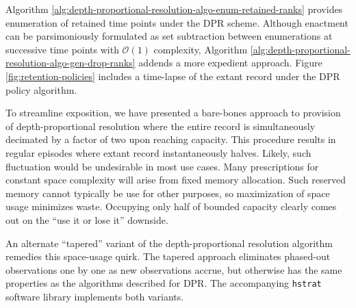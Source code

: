 Algorithm \ref{alg:depth-proportional-resolution-algo-enum-retained-ranks} provides enumeration of retained time points under the DPR scheme.
Although enactment can be parsimoniously formulated as set subtraction between enumerations at successive time points with $\mathcal{O}(1)$ complexity, Algorithm \ref{alg:depth-proportional-resolution-algo-gen-drop-ranks} addends a more expedient approach.
Figure \ref{fig:retention-policies} includes a time-lapse of the extant record under the DPR policy algorithm.

To streamline exposition, we have presented a bare-bones approach to provision of depth-proportional resolution where the entire record is simultaneously decimated by a factor of two upon reaching capacity.
This procedure results in regular episodes where extant record instantaneously halves.
Likely, such fluctuation would be undesirable in most use cases.
Many prescriptions for constant space complexity will arise from fixed memory allocation.
Such reserved memory cannot typically be use for other purposes, so maximization of space usage minimizes waste.
Occupying only half of bounded capacity clearly comes out on the ``use it or lose it'' downside.

An alternate ``tapered'' variant of the depth-proportional resolution algorithm remedies this space-usage quirk.
The tapered approach eliminates phased-out observations one by one as new observations accrue, but otherwise has the same properties as the algorithms described for DPR.
The accompanying \texttt{hstrat} software library implements both variants.



% 
% 
